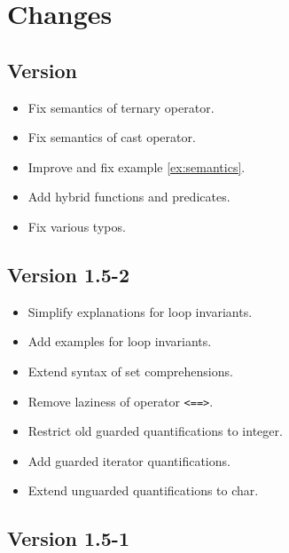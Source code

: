\section{Changes}

\subsection{Version \version}

\begin{itemize}
\item Fix semantics of ternary operator.
\item Fix semantics of cast operator.
\item Improve and fix example \ref{ex:semantics}.
\item Add hybrid functions and predicates.
\item Fix various typos.
\end{itemize}

\subsection{Version 1.5-2}

\begin{itemize}
\item Simplify explanations for loop invariants.
\item Add examples for loop invariants.
\item Extend syntax of set comprehensions.
\item Remove laziness of operator \lstinline|<==>|.
\item Restrict old guarded quantifications to integer.
\item Add guarded iterator quantifications.
\item Extend unguarded quantifications to char.
\end{itemize}

\subsection{Version 1.5-1}

